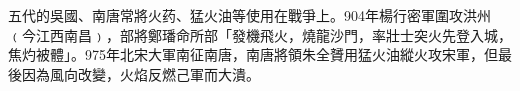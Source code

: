 五代的吳國、南唐常將火药、猛火油等使用在戰爭上。904年楊行密軍圍攻洪州﹙今江西南昌﹚，部將鄭璠命所部「發機飛火，燒龍沙門，率壯士突火先登入城，焦灼被體」。975年北宋大軍南征南唐，南唐將領朱全贇用猛火油縱火攻宋軍，但最後因為風向改變，火焰反燃己軍而大潰。








